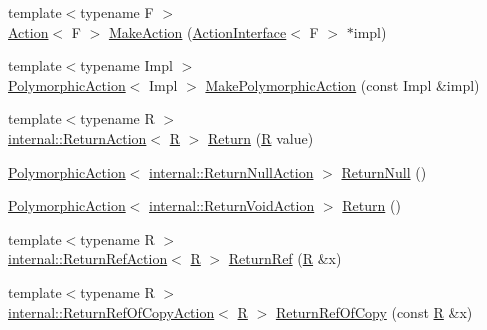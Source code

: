 \begin{DoxyCompactItemize}
\item 
{\footnotesize template$<$typename F $>$ }\\\hyperlink{classtesting_1_1_action}{Action}$<$ F $>$ \hyperlink{namespacetesting_ae6b9960db2b2685e043ce5215291f5b8}{Make\+Action} (\hyperlink{classtesting_1_1_action_interface}{Action\+Interface}$<$ F $>$ $\ast$impl)
\item 
{\footnotesize template$<$typename Impl $>$ }\\\hyperlink{classtesting_1_1_polymorphic_action}{Polymorphic\+Action}$<$ Impl $>$ \hyperlink{namespacetesting_a36bd06c5ea972c6df0bd9f40a7a94c65}{Make\+Polymorphic\+Action} (const Impl \&impl)
\item 
{\footnotesize template$<$typename R $>$ }\\\hyperlink{classtesting_1_1internal_1_1_return_action}{internal\+::\+Return\+Action}$<$ \hyperlink{typedefs__9_8js_afb423b73ee7b6c04d2d54fc06e405404}{R} $>$ \hyperlink{namespacetesting_af6d1c13e9376c77671e37545cd84359c}{Return} (\hyperlink{typedefs__9_8js_afb423b73ee7b6c04d2d54fc06e405404}{R} value)
\item 
\hyperlink{classtesting_1_1_polymorphic_action}{Polymorphic\+Action}$<$ \hyperlink{classtesting_1_1internal_1_1_return_null_action}{internal\+::\+Return\+Null\+Action} $>$ \hyperlink{namespacetesting_aa0331596e269114da101f810d3a1b88b}{Return\+Null} ()
\item 
\hyperlink{classtesting_1_1_polymorphic_action}{Polymorphic\+Action}$<$ \hyperlink{classtesting_1_1internal_1_1_return_void_action}{internal\+::\+Return\+Void\+Action} $>$ \hyperlink{namespacetesting_a8da8e53d2e7bc4e3c531f7435ad04823}{Return} ()
\item 
{\footnotesize template$<$typename R $>$ }\\\hyperlink{classtesting_1_1internal_1_1_return_ref_action}{internal\+::\+Return\+Ref\+Action}$<$ \hyperlink{typedefs__9_8js_afb423b73ee7b6c04d2d54fc06e405404}{R} $>$ \hyperlink{namespacetesting_a18eda8fe9c89ee856c199a2e04ca1641}{Return\+Ref} (\hyperlink{typedefs__9_8js_afb423b73ee7b6c04d2d54fc06e405404}{R} \&x)
\item 
{\footnotesize template$<$typename R $>$ }\\\hyperlink{classtesting_1_1internal_1_1_return_ref_of_copy_action}{internal\+::\+Return\+Ref\+Of\+Copy\+Action}$<$ \hyperlink{typedefs__9_8js_afb423b73ee7b6c04d2d54fc06e405404}{R} $>$ \hyperlink{namespacetesting_ac1b75444c89371dc25ebcfcc48336201}{Return\+Ref\+Of\+Copy} (const \hyperlink{typedefs__9_8js_afb423b73ee7b6c04d2d54fc06e405404}{R} \&x)

\end{DoxyCompactItemize}
